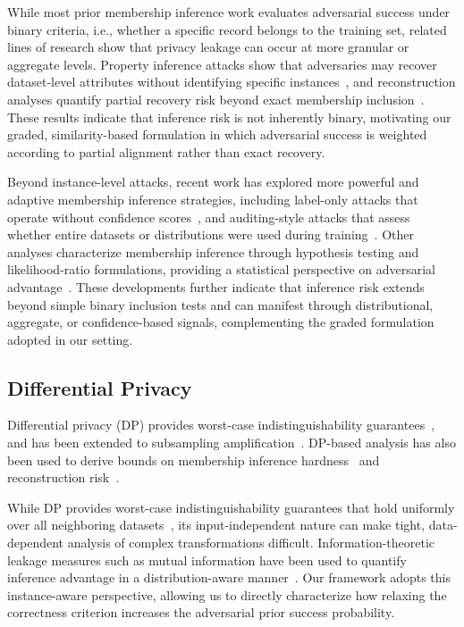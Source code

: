 \documentclass[sigconf,anonymous, review]{acmart}
\begin{document}
While most prior membership inference work evaluates adversarial success under binary criteria, i.e., whether a specific record belongs to the training set, related lines of research show that privacy leakage can occur at more granular or aggregate levels. Property inference attacks show that adversaries may recover dataset-level attributes without identifying specific instances~\cite{ganju2018property,melis2019exploiting}, and reconstruction analyses quantify partial recovery risk beyond exact membership inclusion~\cite{balle2022reconstructing,guo2022bounding}. These results indicate that inference risk is not inherently binary, motivating our graded, similarity-based formulation in which adversarial success is weighted according to partial alignment rather than exact recovery.

Beyond instance-level attacks, recent work has explored more powerful and adaptive membership inference strategies, including label-only attacks that operate without confidence scores~\cite{choquette2021label}, and auditing-style attacks that assess whether entire datasets or distributions were used during training~\cite{sablayrolles2019white}. Other analyses characterize membership inference through hypothesis testing and likelihood-ratio formulations, providing a statistical perspective on adversarial advantage~\cite{yeom2018privacy}. These developments further indicate that inference risk extends beyond simple binary inclusion tests and can manifest through distributional, aggregate, or confidence-based signals, complementing the graded formulation adopted in our setting.

\subsection{Differential Privacy}

Differential privacy (DP) provides worst-case indistinguishability guarantees~\cite{dwork2008differential,duchi2013local,bun2016cdp}, and has been extended to subsampling amplification~\cite{balle2018subsampling}. DP-based analysis has also been used to derive bounds on membership inference hardness~\cite{thudi2022bounding} and reconstruction risk~\cite{balle2022reconstructing}.

While DP provides worst-case indistinguishability guarantees that hold uniformly over all neighboring datasets~\cite{dwork2008differential,duchi2013local,bun2016cdp}, its input-independent nature can make tight, data-dependent analysis of complex transformations difficult. Information-theoretic leakage measures such as mutual information have been used to quantify inference advantage in a distribution-aware manner~\cite{russo2016controlling,raginsky2016information,xiao2023pacprivacy}. Our framework adopts this instance-aware perspective, allowing us to directly characterize how relaxing the correctness criterion increases the adversarial prior success probability.
\end{document}
